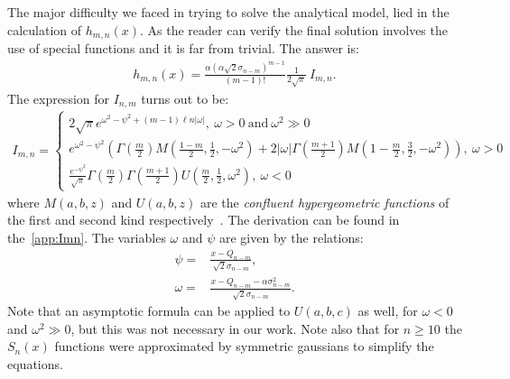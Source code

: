 \documentclass[preprint,12pt]{elsarticle}
\begin{document}
The major difficulty we faced in trying to solve the analytical model, lied in the calculation of $h_{m,n}(x)$. 
As the reader can verify the final solution involves the use of special functions and it is far from trivial. 
The answer is:
\begin{align}
h_{m,n}(x) =  \frac{\alpha (\alpha\sqrt{2} \sigma_{n-m})^{m-1}}{(m-1)!} \frac{1}{2\sqrt{\pi}} \  I_{m,n}.
\end{align}  
The expression for $I_{n,m}$ turns out to be:
\begin{align}
I_{m,n} = 
\begin{cases}
2\sqrt{\pi}   e^{\omega^2 - \psi^2 + (m-1) \ell n |\omega|}, \ \omega>0 \ \text{and} \  \omega^2 \gg 0\\
e^{\omega^2 -\psi^2 } \left( \Gamma\left( \frac{m}{2} \right) M\left(\frac{1-m}{2}, \frac{1}{2}, -\omega^2 \right)  
+ 2|\omega| \Gamma\left( \frac{m+1}{2} \right) M\left(1-\frac{m}{2}, \frac{3}{2}, -\omega^2 \right)       \right), \ \omega > 0  \\
\frac{ e^{ -\psi^2 } }{\sqrt{\pi}}   \Gamma\left( \frac{m}{2} \right)   \Gamma\left( \frac{m+1}{2} \right) U\left( \frac{m}{2}, \frac{1}{2}, \omega^2  \right), \ \omega<0
\end{cases}
\nonumber
\end{align} 
where $M(a,b,z)$ and $U(a,b,z)$ are the \emph{confluent hypergeometric functions} of the first and second kind respectively~\cite{error}. 
The derivation can be found in the~\ref{app:Imn}. 
The variables $\omega$ and $\psi$ are given by the relations:
\begin{align}
\psi = & \frac{x-Q_{n-m}}{\sqrt{2}\sigma_{n-m}}, \\
\omega = & \frac{x-Q_{n-m} -\alpha\sigma^2_{n-m}}{\sqrt{2}\sigma_{n-m}}.
\end{align}  
Note that an asymptotic formula can be applied to $U(a,b,c)$ as well, for $\omega < 0$ and $\omega^2 \gg 0$, but this was not necessary in our work. 
Note also that for $n\geq10$ the $S_n(x)$ functions were approximated by symmetric gaussians to simplify the equations. 
\end{document}
